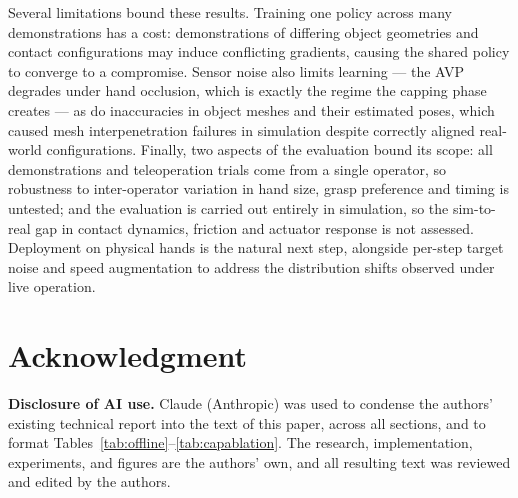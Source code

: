 \documentclass[letterpaper, 10 pt, conference]{ieeeconf}
\begin{document}
Several limitations bound these results. Training one policy across many demonstrations
has a cost: demonstrations of differing object geometries and contact configurations may
induce conflicting gradients, causing the shared policy to converge to a compromise. Sensor noise also limits learning --- the AVP degrades under hand
occlusion, which is exactly the regime the capping phase creates --- as do inaccuracies
in object meshes and their estimated poses, which caused mesh interpenetration failures
in simulation despite correctly aligned real-world configurations. Finally, two aspects
of the evaluation bound its scope: all demonstrations and teleoperation trials come from
a single operator, so robustness to inter-operator variation in hand size, grasp
preference and timing is untested; and the evaluation is carried out entirely in
simulation, so the sim-to-real gap in contact dynamics, friction and actuator response
is not assessed. Deployment on physical hands is the natural next step, alongside
per-step target noise and speed augmentation to address the distribution shifts observed
under live operation.

\section*{Acknowledgment}


\textbf{Disclosure of AI use.} Claude (Anthropic) was used to condense the authors'
existing technical report into the text of this paper, across all sections, and to
format Tables~\ref{tab:offline}--\ref{tab:capablation}. The research, implementation,
experiments, and figures are the authors' own, and all resulting text was reviewed and
edited by the authors.

\printbibliography
\end{document}
